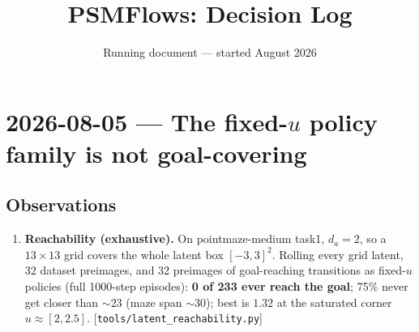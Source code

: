 \documentclass[11pt]{article}
\title{PSMFlows: Decision Log}
\author{}
\date{Running document --- started August 2026}
\begin{document}
\maketitle

\section{2026-08-05 --- The fixed-$u$ policy family is not goal-covering}

\subsection*{Observations}
\begin{enumerate}
  \item \textbf{Reachability (exhaustive).} On pointmaze-medium task1, $d_a=2$, so a
    $13{\times}13$ grid covers the whole latent box $[-3,3]^2$. Rolling every grid
    latent, 32 dataset preimages, and 32 preimages of goal-reaching transitions as
    fixed-$u$ policies (full 1000-step episodes): \textbf{0 of 233 ever reach the goal};
    75\% never get closer than ${\sim}23$ (maze span ${\sim}30$); best is $1.32$ at the
    saturated corner $u\approx[2,2.5]$.
    [\texttt{tools/latent\_reachability.py}]


\end{enumerate}
\end{document}
